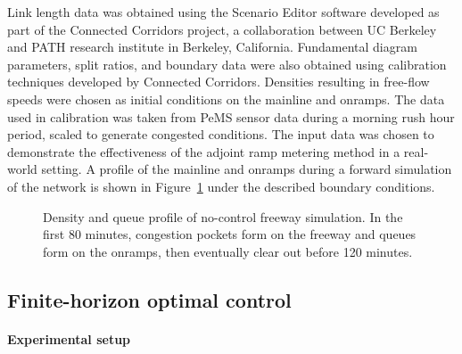				
				Link length data was obtained using the Scenario Editor software developed
				as part of the Connected Corridors project, a collaboration between
				UC Berkeley and PATH research institute in Berkeley, California.
				Fundamental diagram parameters, split ratios, and boundary data were
				also obtained using calibration techniques developed by Connected
				Corridors. Densities resulting in free-flow speeds were chosen as
				initial conditions on the mainline and onramps. The data used in calibration
				was taken from PeMS sensor data during a morning rush hour period,
				scaled to generate congested conditions. The input data was chosen
				to demonstrate the effectiveness of the adjoint ramp metering method
				in a real-world setting. A profile of the mainline and onramps during
				a forward simulation of the network is shown in Figure~\ref{fig:Density-and-queue}
				under the described boundary conditions.
				\begin{figure}[b]
					\hfill{}
								
								\caption{Density and queue profile of no-control freeway simulation. In the
									first 80 minutes, congestion pockets form on the freeway and queues
									form on the onramps, then eventually clear out before 120 minutes.\label{fig:Density-and-queue}}
							\end{figure}
							
							
							
							\subsection{Finite-horizon optimal control\label{sub:Finite-horizon-optimal-control}}
							
							
							\paragraph{Experimental setup}
							
